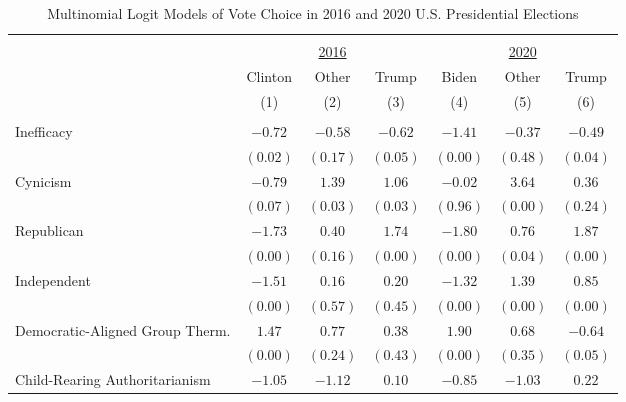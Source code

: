 \begin{table}[!t] \centering 
  \caption{Multinomial Logit Models of Vote Choice in 2016 and 2020 U.S. Presidential Elections} 
  \label{tab:votechoice-16-20-trunc} 
  \renewcommand{\arraystretch}{1}
\begin{adjustbox}{width=0.8\textwidth,center}
\begin{threeparttable}
\begin{tabular}{lccc|ccc}
\\\hline 
\hline 
&&&&&& \\[-1ex]
& & \underline{2016} & & & \underline{2020} & \\[0.8ex]
& Clinton & Other & Trump & Biden & Other & Trump \\[1ex]
& (1) & (2) & (3) & (4) & (5) & (6)\\[1ex]\hline 
  & & & & & &\\
Inefficacy                      & $-0.72$   & $-0.58$   & $-0.62$   & $-1.41$   & $-0.37$   & $-0.49$   \\
                                & $(0.02)$  & $(0.17)$  & $(0.05)$  & $(0.00)$  & $(0.48)$  & $(0.04)$  \\
Cynicism                        & $-0.79$   & $1.39$    & $1.06$    & $-0.02$   & $3.64$    & $0.36$    \\
                                & $(0.07)$  & $(0.03)$  & $(0.03)$  & $(0.96)$  & $(0.00)$  & $(0.24)$  \\
Republican                      & $-1.73$   & $0.40$    & $1.74$    & $-1.80$   & $0.76$    & $1.87$    \\
                                & $(0.00)$  & $(0.16)$  & $(0.00)$  & $(0.00)$  & $(0.04)$  & $(0.00)$  \\
Independent                     & $-1.51$   & $0.16$    & $0.20$    & $-1.32$   & $1.39$    & $0.85$    \\
                                & $(0.00)$  & $(0.57)$  & $(0.45)$  & $(0.00)$  & $(0.00)$  & $(0.00)$  \\
Democratic-Aligned Group Therm. & $1.47$    & $0.77$    & $0.38$    & $1.90$    & $0.68$    & $-0.64$   \\
                                & $(0.00)$  & $(0.24)$  & $(0.43)$  & $(0.00)$  & $(0.35)$  & $(0.05)$  \\
Child-Rearing Authoritarianism  & $-1.05$   & $-1.12$   & $0.10$    & $-0.85$   & $-1.03$   & $0.22$    \\

\end{tabular}
\end{threeparttable}
\end{adjustbox}
\end{table}
